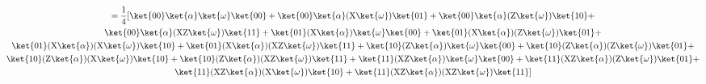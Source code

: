 \documentclass[]{article}
\begin{document}
\begin{enumerate}
\begin{gather*}
          = \frac{1}{4}[ %
          \ket{00}\ket{\alpha}\ket{\omega}\ket{00} +
          \ket{00}\ket{\alpha}(\text{X} \ket{\omega})\ket{01} +
          \ket{00}\ket{\alpha}(\text{Z} \ket{\omega})\ket{10} + \\
          \ket{00}\ket{\alpha}(\text{XZ} \ket{\omega})\ket{11} +
          \ket{01}(\text{X}\ket{\alpha})\ket{\omega}\ket{00} +
          \ket{01}(\text{X}\ket{\alpha})(\text{Z} \ket{\omega})\ket{01} +\\
          \ket{01}(\text{X}\ket{\alpha})(\text{X} \ket{\omega})\ket{10} +
          \ket{01}(\text{X}\ket{\alpha})(\text{XZ} \ket{\omega})\ket{11} +
          \ket{10}(\text{Z}\ket{\alpha})\ket{\omega}\ket{00} +
          \ket{10}(\text{Z}\ket{\alpha})(\text{Z} \ket{\omega})\ket{01} +\\
          \ket{10}(\text{Z}\ket{\alpha})(\text{X} \ket{\omega})\ket{10} +
          \ket{10}(\text{Z}\ket{\alpha})(\text{XZ} \ket{\omega})\ket{11} +
          \ket{11}(\text{XZ}\ket{\alpha})\ket{\omega}\ket{00} +
          \ket{11}(\text{XZ}\ket{\alpha})(\text{Z} \ket{\omega})\ket{01} +\\
          \ket{11}(\text{XZ}\ket{\alpha})(\text{X} \ket{\omega})\ket{10} +
          \ket{11}(\text{XZ}\ket{\alpha})(\text{XZ} \ket{\omega})\ket{11}
          ] \\
        \end{gather*}


\end{enumerate}
\end{document}
